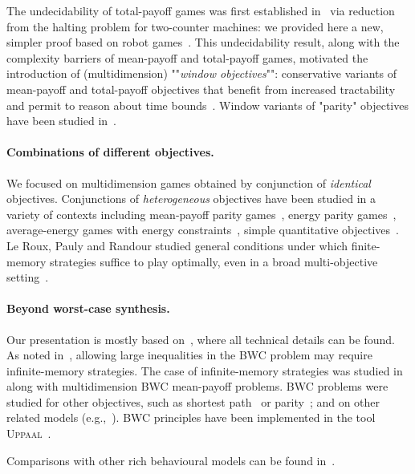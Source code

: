 The undecidability of total-payoff games was first established in~\cite{Chatterjee&al:2015} via reduction from the halting problem for two-counter machines: we provided here a new, simpler proof based on robot games~\cite{Niskanen&Potapov&Reichert:2016}. This undecidability result, along with the complexity barriers of mean-payoff and total-payoff games, motivated the introduction of (multidimension) ""\textit{window objectives}"": conservative variants of mean-payoff and total-payoff objectives that benefit from increased tractability and permit to reason about time bounds~\cite{Chatterjee&al:2015}. Window variants of "parity" objectives have been studied in~\cite{Bruyere&Hautem&Randour:2016}.

\paragraph{Combinations of different objectives.} We focused on multidimension games obtained by conjunction of \textit{identical} objectives. Conjunctions of \textit{heterogeneous} objectives have been studied in a variety of contexts including mean-payoff parity games~\cite{Chatterjee&Henzinger&Jurdzinski:2005,Daviaud&Jurdzinski&Lazic:2018}, energy parity games~\cite{Chatterjee&Doyen:2012,Chatterjee&Randour&Raskin:2014}, average-energy games with energy constraints~\cite{Bouyer&al:2018,Bouyer&al:2017}, simple quantitative objectives~\cite{Bruyere&Hautem&Raskin:2016}. Le Roux, Pauly and Randour studied general conditions under which finite-memory strategies suffice to play optimally, even in a broad multi-objective setting~\cite{LeRoux&Pauly&Randour:2018}.


\paragraph{Beyond worst-case synthesis.} Our presentation is mostly based on~\cite{Bruyere&al:2017}, where all technical details can be found. As noted in~\cite{Bruyere&al:2017}, allowing large inequalities in the BWC problem may require infinite-memory strategies. The case of infinite-memory strategies was studied in~\cite{Clemente&Raskin:2015} along with multidimension BWC mean-payoff problems. BWC problems were studied for other objectives, such as shortest path~\cite{Bruyere&al:2017} or parity~\cite{Berthon&Randour&Raskin:2017}; and on other related models (e.g.,~\cite{Brazdil&Kucera&Novotny:2016,Almagor&Kupferman&Velner:2016}). BWC principles have been implemented in the tool \textsc{Uppaal}~\cite{David&al:2014}.

Comparisons with other rich behavioural models can be found in~\cite{Randour&Raskin&Sankur:2015,Brenguier&al:2016}.